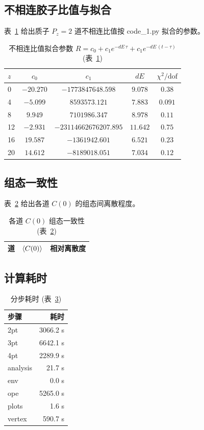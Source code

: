 \documentclass[11pt,a4paper]{article}
\begin{document}
\subsection{不相连胶子比值与拟合}
表~\ref{tab:disc} 给出质子 $P_z=2$ 道不相连比值按 code\_1.py 拟合的参数。
\begin{table}[h]
\centering
\caption{不相连比值拟合参数 $R=c_0+c_1e^{-dE\,\tau}+c_1e^{-dE\,(t-\tau)}$ (表~\ref{tab:disc})}
\label{tab:disc}
\begin{tabular}{lcccc}
\toprule
$z$ & $c_0$ & $c_1$ & $dE$ & $\chi^2/\mathrm{dof}$ \\
\midrule
    0 & $-20.270$ & $-1773847648.598$ & $9.078$ & $0.38$ \\
    4 & $-5.099$ & $8593573.121$ & $7.883$ & $0.091$ \\
    8 & $9.949$ & $7101986.347$ & $8.978$ & $0.11$ \\
    12 & $-2.931$ & $-23114662676207.895$ & $11.642$ & $0.75$ \\
    16 & $19.587$ & $-1361942.601$ & $6.521$ & $0.23$ \\
    20 & $14.612$ & $-8189018.051$ & $7.034$ & $0.12$ \\
\bottomrule
\end{tabular}
\end{table}

\subsection{组态一致性}
表~\ref{tab:config} 给出各道 $C(0)$ 的组态间离散程度。
\begin{table}[h]
\centering
\caption{各道 $C(0)$ 组态一致性 (表~\ref{tab:config})}
\label{tab:config}
\begin{tabular}{lcc}
\toprule
道 & $\braket{C(0)}$ & 相对离散度 \\
\midrule

\bottomrule
\end{tabular}
\end{table}

\subsection{计算耗时}
\begin{table}[h]
\centering
\caption{分步耗时 (表~\ref{tab:timing})}
\label{tab:timing}
\begin{tabular}{lr}
\toprule
步骤 & 耗时 \\
\midrule
    2pt & 3066.2 s \\
    3pt & 6642.1 s \\
    4pt & 2289.9 s \\
    analysis & 21.7 s \\
    env & 0.0 s \\
    ope & 5265.0 s \\
    plots & 1.6 s \\
    vertex & 590.7 s \\
\bottomrule
\end{tabular}
\end{table}
\end{document}
